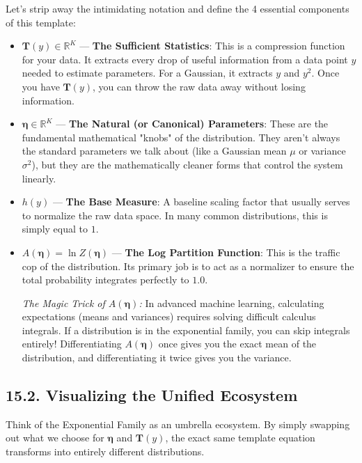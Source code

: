 \documentclass{article}
\begin{document}
Let's strip away the intimidating notation and define the 4 essential components of this template:
\begin{itemize}
    \item $\mathbf{T}(y) \in \mathbb{R}^K$ --- \textbf{The Sufficient Statistics}: This is a compression function for your data. It extracts every drop of useful information from a data point $y$ needed to estimate parameters. For a Gaussian, it extracts $y$ and $y^2$. Once you have $\mathbf{T}(y)$, you can throw the raw data away without losing information.
    \item $\boldsymbol{\eta} \in \mathbb{R}^K$ --- \textbf{The Natural (or Canonical) Parameters}: These are the fundamental mathematical "knobs" of the distribution. They aren't always the standard parameters we talk about (like a Gaussian mean $\mu$ or variance $\sigma^2$), but they are the mathematically cleaner forms that control the system linearly.
    \item $h(y)$ --- \textbf{The Base Measure}: A baseline scaling factor that usually serves to normalize the raw data space. In many common distributions, this is simply equal to $1$.
    \item $A(\boldsymbol{\eta}) = \ln Z(\boldsymbol{\eta})$ --- \textbf{The Log Partition Function}: This is the traffic cop of the distribution. Its primary job is to act as a normalizer to ensure the total probability integrates perfectly to $1.0$. 
    
    \textit{The Magic Trick of $A(\boldsymbol{\eta})$:} In advanced machine learning, calculating expectations (means and variances) requires solving difficult calculus integrals. If a distribution is in the exponential family, you can skip integrals entirely! Differentiating $A(\boldsymbol{\eta})$ once gives you the exact mean of the distribution, and differentiating it twice gives you the variance.
\end{itemize}

\subsection*{15.2. Visualizing the Unified Ecosystem}
Think of the Exponential Family as an umbrella ecosystem. By simply swapping out what we choose for $\boldsymbol{\eta}$ and $\mathbf{T}(y)$, the exact same template equation transforms into entirely different distributions.
\end{document}
